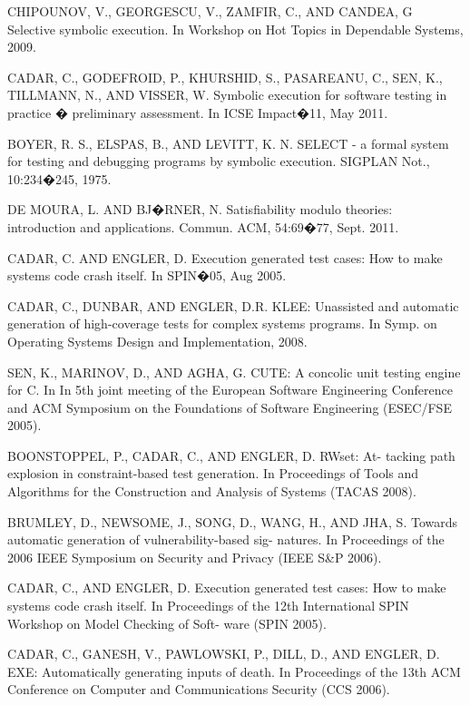 \documentclass[conference]{IEEEtran}
\begin{document}
\begin{thebibliography}{1}

CHIPOUNOV, V., GEORGESCU, V., ZAMFIR, C., AND CANDEA, G
Selective symbolic execution. In Workshop on Hot Topics
in Dependable Systems, 2009.

CADAR, C., GODEFROID, P., KHURSHID, S., PASAREANU, C., SEN, K., TILLMANN, N., AND VISSER, W.
Symbolic execution for software testing in practice � preliminary assessment. In ICSE Impact�11, May 2011.

BOYER, R. S., ELSPAS, B., AND LEVITT, K. N.
SELECT - a formal system for testing and debugging programs by symbolic execution.
SIGPLAN Not., 10:234�245, 1975.

DE MOURA, L. AND BJ�RNER, N.
Satisfiability modulo theories: introduction and applications.
Commun. ACM, 54:69�77, Sept. 2011.

CADAR, C. AND ENGLER, D.
Execution generated test cases: How to make systems code crash itself.
In SPIN�05, Aug 2005.

CADAR, C., DUNBAR, AND ENGLER, D.R.
KLEE: Unassisted and automatic generation of high-coverage tests
for complex systems programs. In Symp. on Operating Systems
Design and Implementation, 2008.

SEN, K., MARINOV, D., AND AGHA, G. CUTE: A concolic unit testing engine for C. In In 5th joint meeting of the European Software Engineering Conference and ACM Symposium on the Foundations of Software Engineering (ESEC/FSE 2005).

BOONSTOPPEL, P., CADAR, C., AND ENGLER, D. RWset: At- tacking path explosion in constraint-based test generation. In Proceedings of Tools and Algorithms for the Construction and Analysis of Systems (TACAS 2008).

BRUMLEY, D., NEWSOME, J., SONG, D., WANG, H., AND JHA, S. Towards automatic generation of vulnerability-based sig- natures. In Proceedings of the 2006 IEEE Symposium on Security and Privacy (IEEE S\&P 2006).

CADAR, C., AND ENGLER, D. Execution generated test cases: How to make systems code crash itself. In Proceedings of the 12th International SPIN Workshop on Model Checking of Soft- ware (SPIN 2005).

CADAR, C., GANESH, V., PAWLOWSKI, P., DILL, D., AND ENGLER, D. EXE: Automatically generating inputs of death. In Proceedings of the 13th ACM Conference on Computer and Communications Security (CCS 2006).


\end{thebibliography}
\end{document}
